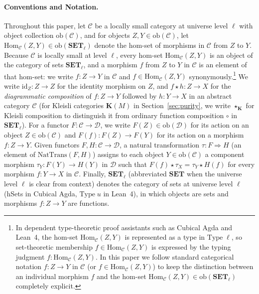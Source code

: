\documentclass[11pt,a4paper]{article}
\theoremstyle{definition}
\theoremstyle{remark}
\newcommand{\Set}{\mathbf{SET}}
\newcommand{\Hom}{\mathrm{Hom}}
\newcommand{\NatTrans}{\mathrm{NatTrans}}
\newcommand{\id}{\mathrm{id}}
\newcommand{\K}{\mathbf{K}}
\newcommand{\starK}{\mathbin{\star_{\K}}}
\begin{document}
\paragraph{Conventions and Notation.}
Throughout this paper, let $\mathcal{C}$ be a locally small category at universe level $\ell$ with object
collection $\mathrm{ob}(\mathcal{C})$, and for objects $Z, Y \in \mathrm{ob}(\mathcal{C})$, let
$\Hom_{\mathcal{C}}(Z, Y) \in \mathrm{ob}(\Set_\ell)$ denote the hom-set of morphisms in $\mathcal{C}$
from $Z$ to $Y$. Because $\mathcal{C}$ is locally small at level $\ell$, every hom-set
$\Hom_{\mathcal{C}}(Z, Y)$ is an object of the category of sets $\Set_\ell$, and a morphism $f$ from $Z$
to $Y$ in $\mathcal{C}$ is an element of that hom-set: we write $f : Z \to Y$ in $\mathcal{C}$ and
$f \in \Hom_{\mathcal{C}}(Z, Y)$ synonymously.\footnote{In dependent type-theoretic proof assistants such
as Cubical Agda and Lean~4, the hom-set $\Hom_{\mathcal{C}}(Z, Y)$ is represented as a type in
$\mathrm{Type}\;\ell$, so set-theoretic membership $f \in \Hom_{\mathcal{C}}(Z, Y)$ is expressed by the
typing judgment $f : \Hom_{\mathcal{C}}(Z, Y)$. In this paper we follow standard categorical notation
$f : Z \to Y$ in $\mathcal{C}$ (or $f \in \Hom_{\mathcal{C}}(Z, Y)$) to keep the distinction between an
individual morphism $f$ and the hom-set $\Hom_{\mathcal{C}}(Z, Y) \in \mathrm{ob}(\Set_\ell)$ completely
explicit.}
We write $\id_Z : Z \to Z$ for the identity morphism on $Z$, and $f \star h : Z \to X$ for the
\emph{diagrammatic composition} of $f : Z \to Y$ followed by $h : Y \to X$ in an abstract category
$\mathcal{C}$ (for Kleisli categories $\K(M)$ in Section~\ref{sec:purity}, we write $\starK$ for Kleisli
composition to distinguish it from ordinary function composition $\circ$ in $\Set_\ell$). For a functor
$F : \mathcal{C} \to \mathcal{D}$, we write $F(Z) \in \mathrm{ob}(\mathcal{D})$ for its action on an
object $Z \in \mathrm{ob}(\mathcal{C})$ and $F(f) : F(Z) \to F(Y)$ for its action on a morphism
$f : Z \to Y$. Given functors $F, H : \mathcal{C} \to \mathcal{D}$, a natural transformation
$\tau : F \Rightarrow H$ (an element of $\NatTrans(F, H)$) assigns to each object
$Y \in \mathrm{ob}(\mathcal{C})$ a component morphism $\tau_Y : F(Y) \to H(Y)$ in $\mathcal{D}$ such
that $F(f) \star \tau_X = \tau_Y \star H(f)$ for every morphism $f : Y \to X$ in $\mathcal{C}$.
Finally, $\Set_\ell$ (abbreviated $\Set$ when the universe level $\ell$ is clear from context) denotes
the category of sets at universe level $\ell$ (hSets in Cubical Agda, $\mathrm{Type}\;u$ in Lean~4), in
which objects are sets and morphisms $f : Z \to Y$ are functions.
\end{document}
